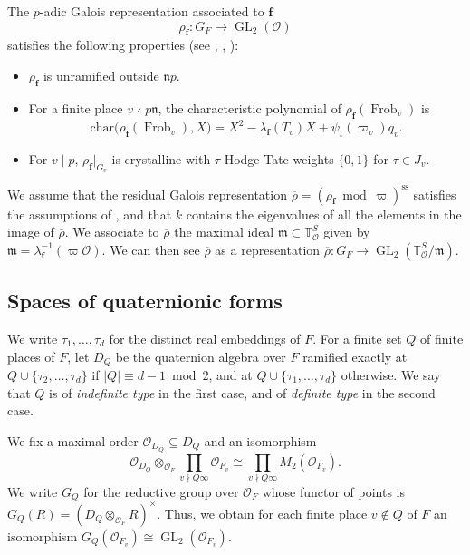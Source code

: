 \documentclass[a4paper, notitlepage, 10pt]{amsart}
\theoremstyle{plain} %
\theoremstyle{definition} %
\theoremstyle{remark} %
\numberwithin{equation}{section}
\newcommand{\bbT}{\mathbb T}
\newcommand{\GL}{\operatorname{GL}} %
\newcommand{\Frob}{\operatorname{Frob}} %
\begin{document}
The $p$-adic Galois representation associated to $\mathbf{f}$
$$ \rho_{\mathbf{f}}: G_F \longrightarrow \GL_2(\mathcal{O}) $$
satisfies the following properties (see \cite{Car}, \cite[Lemma 3.4.2]{Kis09}, \cite[\S 12.4]{Nek06}):
\begin{itemize}
    \item $\rho_{\mathbf{f}}$ is unramified outside $\mathfrak{n}p$.
    \item For a finite place $v \nmid p\mathfrak{n}$, the characteristic polynomial of $\rho_{\mathbf{f}}(\Frob_v)$ is
    $$\mathrm{char}\big(\rho_{\mathbf{f}}(\Frob_v),X\big)=X^2-\lambda_{\mathbf{f}}(T_v)X+ \psi_\iota(\varpi_v)q_v.$$
    \item For $v\mid p$, $\rho_{\mathbf{f}}|_{G_{v}}$ is crystalline with $\tau$-Hodge-Tate weights $\{0,1\}$ for $\tau\in J_v$.
\end{itemize}
We assume that the residual Galois representation $\overline{\rho}=(\rho_{\mathbf{f}} \bmod \varpi)^{\text{ss}}$ satisfies the assumptions of , and that $k$ contains the eigenvalues of all the elements in the image of $\overline{\rho}$. We associate to $\overline{\rho}$ the maximal ideal  $\mathfrak{m}\subset \mathbb{T}^{S}_{\mathcal{O}}$ given by $\mathfrak{m}=\lambda_{\mathbf{f}}^{-1}(\varpi\mathcal{O})$. We can then see $\overline{\rho}$ as a representation $\overline{\rho}\colon G_F\to \GL_2(\bbT^{S}_{\mathcal{O}}/\mathfrak{m})$.
\subsection{Spaces of quaternionic forms}

 We write $\tau_1,\dots,\tau_d$ for the distinct real embeddings of $F$. For a finite set $Q$ of finite places of $F$, let $D_Q$ be the quaternion algebra over $F$ ramified exactly at $Q\cup \{\tau_2,\dots,\tau_d\}$ if $|Q| \equiv d-1 \bmod 2$, and at $Q\cup \{\tau_1,\dots,\tau_d\}$ otherwise. We say that $Q$ is of \emph{indefinite type} in the first case, and of \emph{definite type} in the second case.

 We fix a maximal order $\mathcal{O}_{D_Q}\subseteq D_Q$ and an isomorphism $$\mathcal{O}_{D_Q}\otimes_{\mathcal{O}_F}\prod_{v\nmid Q\infty} \mathcal{O}_{F_v}\cong \prod_{v\nmid Q\infty} M_2(\mathcal{O}_{F_v}). $$  We write $G_{Q}$ for the reductive group over $\mathcal{O}_F$ whose functor of points is $G_{Q}(R)=(D_Q\otimes_{\mathcal{O}_F}R)^\times$. Thus, we obtain for each finite place $v\not\in Q$ of $F$ an isomorphism $G_{Q}(\mathcal{O}_{F_v})\cong \GL_2(\mathcal{O}_{F_v})$.
 
\end{document}

